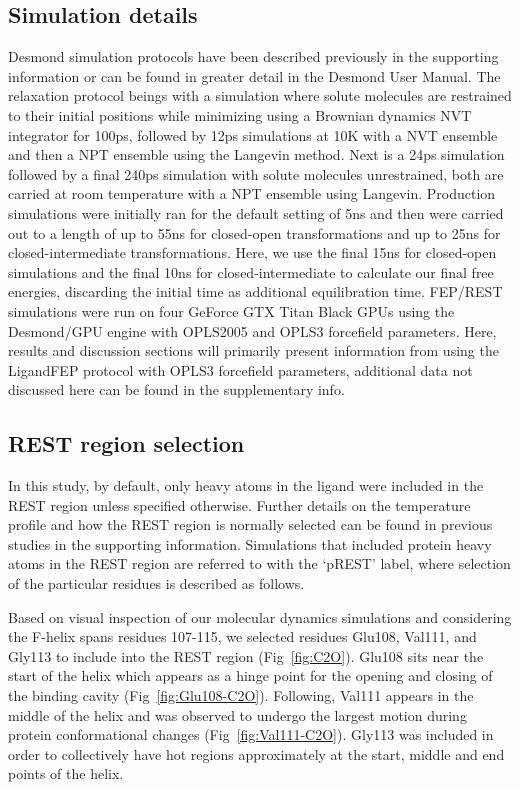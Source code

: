 \documentclass[journal=jctcce,manuscript=article]{achemso}
\begin{document}
\subsection*{Simulation details}
Desmond\cite{DESMONDSoftware,DESMONDarticle,DESMONDPaper1,DESMONDPaper2} simulation protocols have been described previously in the supporting information\cite{FEPplus} or can be found in greater detail in the Desmond User Manual\cite{DESMONDManual}.
The relaxation protocol beings with a simulation where solute molecules are restrained to their initial positions while minimizing using a Brownian dynamics NVT integrator for 100ps, followed by 12ps simulations at 10K with a NVT ensemble and then a NPT ensemble using the Langevin method\cite{Langevin}.
Next is a 24ps simulation followed by a final 240ps simulation with solute molecules unrestrained, both are carried at room temperature with a NPT ensemble using Langevin.
Production simulations were initially ran for the default setting of 5ns and then were carried out to a length of up to 55ns for closed-open transformations and up to 25ns for closed-intermediate transformations.
Here, we use the final 15ns for closed-open simulations and the final 10ns for closed-intermediate to calculate our final free energies, discarding the initial time as additional equilibration time.
FEP/REST simulations were run on four GeForce GTX Titan Black GPUs using the Desmond/GPU engine with OPLS2005\cite{OPLS2005} and OPLS3\cite{OPLS3} forcefield parameters.
Here, results and discussion sections will primarily present information from using the LigandFEP protocol with OPLS3 forcefield parameters, additional data not discussed here can be found in the supplementary info.

\subsection*{REST region selection}
In this study, by default, only heavy atoms in the ligand were included in the REST region unless specified otherwise.
Further details on the temperature profile and how the REST region is normally selected can be found in previous studies\cite{FEP/REST,FEPplus} in the supporting information.
Simulations that included protein heavy atoms in the REST region are referred to with the `pREST' label, where selection of the particular residues is described as follows.

Based on visual inspection of our molecular dynamics simulations and considering the F-helix spans residues 107-115, we selected residues Glu108, Val111, and Gly113 to include into the REST region (Fig~\ref{fig:C2O}).
Glu108 sits near the start of the helix which appears as a hinge point for the opening and closing of the binding cavity (Fig~\ref{fig:Glu108-C2O}).
Following, Val111 appears in the middle of the helix and was observed to undergo the largest motion during protein conformational changes (Fig~\ref{fig:Val111-C2O}).
Gly113 was included in order to collectively have hot regions approximately at the start, middle and end points of the helix.
\end{document}
